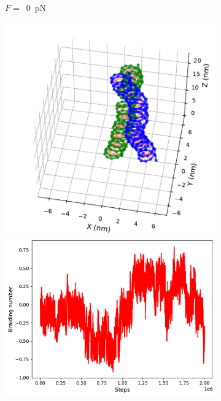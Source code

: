 \documentclass[a4paper,10pt]{article}
\begin{document}
\begin{figure}[tb]
\begin{subfigure}{.3\textwidth}
\caption{$F=$~\SI{0}{\pico\newton}}
\label{fig:braF_a}
\end{subfigure}
\begin{subfigure}{.3\textwidth}
\includegraphics[width=\textwidth]{brF_60_2000000.pdf}
\includegraphics[width=\textwidth]{brF_60_braid.pdf}

\end{subfigure}
\end{figure}
\end{document}
